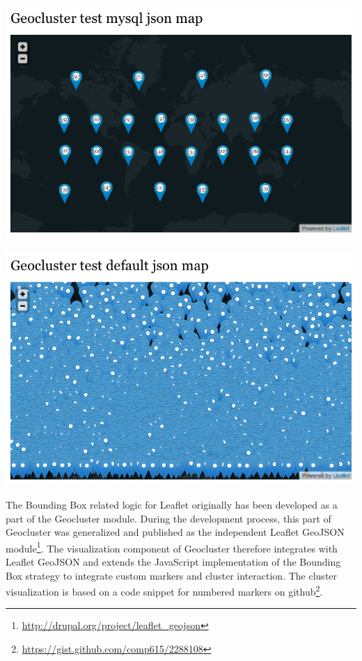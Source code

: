 \begin{itemize}
\hspace*{-1.5cm}\parbox [h]{0.5\textwidth}{
    \includegraphics [width=\linewidth]{figures/map_clustered.png}
    \label{fig:map-clustered}
}
\hfill
\hspace{0.5cm}
\parbox [h]{0.5\textwidth }{
    \includegraphics [width=\linewidth]{figures/map_unclustered.png}
    \label{fig:map-unclustered}
}


The Bounding Box related logic for Leaflet originally has been developed as a part of the Geocluster module. During the development process, this part of Geocluster was generalized and published as the independent Leaflet GeoJSON module\footnote{\url{http://drupal.org/project/leaflet_geojson}}. The visualization component of Geocluster therefore integrates with Leaflet GeoJSON and extends the JavaScript implementation of the Bounding Box strategy to integrate custom markers and cluster interaction. The cluster visualization is based on a code snippet for numbered markers on github\footnote{\url{https://gist.github.com/comp615/2288108}}.



\end{itemize}
